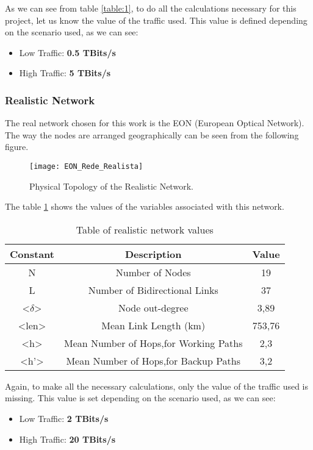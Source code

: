 As we can see from table \ref{table:1}, to do all the calculations necessary for this project, let us know the value of the traffic used. This value is defined depending on the scenario used, as we can see:
\begin{itemize}
  \item Low Traffic: \textbf{0.5 TBits/s}
  \item High Traffic: \textbf{5 TBits/s}
\end{itemize}

\subsubsection{Realistic Network}
The real network chosen for this work is the EON (European Optical Network).
The way the nodes are arranged geographically can be seen from the following figure.

\begin{figure}[h!]
\centering
\texttt{[image: EON\_Rede\_Realista]}
\caption{Physical Topology of the Realistic Network.}
\end{figure}

\begin{table}[h!]
The table \ref{table:2} shows the values of the variables associated with this network.\vspace{10pt}
\centering
\begin{tabular}{|| c | c | c||}
 \hline
 Constant & Description & Value \\
 \hline\hline
 N & Number of Nodes & 19 \\
 L & Number of Bidirectional Links & 37 \\
 <$\delta$> & Node out-degree & 3,89 \\
 <len> & Mean Link Length (km) & 753,76 \\
 <h> & Mean Number of Hops,for Working Paths & 2,3 \\
 <h'> & Mean Number of Hops,for Backup Paths & 3,2 \\
 \hline
\end{tabular}
\caption{Table of realistic network values}
\label{table:2}
\end{table}

Again, to make all the necessary calculations, only the value of the traffic used is missing. This value is set depending on the scenario used, as we can see:

\begin{itemize}
  \item Low Traffic: \textbf{2 TBits/s}
  \item High Traffic: \textbf{20 TBits/s}
\end{itemize}

